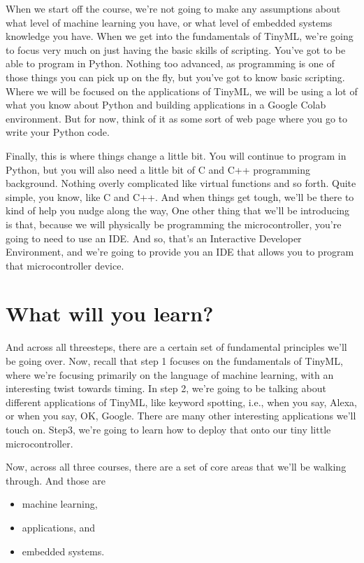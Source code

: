 When we start off the course, we're not going to make any assumptions about what level of machine learning you have, or what level of embedded systems knowledge you have.
When we get into the fundamentals of TinyML, we're going to focus very much on just having the basic skills of scripting.
You've got to be able to program in Python.
Nothing too advanced, as programming is one of those things you can pick up on the fly, but you've got to know basic scripting. Where we will be focused on the applications of TinyML, we will be using a lot of what you know about Python and building applications in a Google Colab environment.
But for now, think of it as some sort of web page where you go to write your Python code.


Finally, this is where things change a little bit.
You will continue to program in Python, but you will also need a little bit of C and C++ programming background.
Nothing overly complicated like virtual functions and so forth.
Quite simple, you know, like C and C++.
And when things get tough, we'll be there to kind of help you nudge along the way, One other thing that we'll be introducing  is that, because we will physically be programming the microcontroller, you're going to need to use an IDE.
And so, that's an Interactive Developer Environment, and we're going to provide you an IDE that allows you
to program that microcontroller device.



\section{What will you learn?}


And across all threesteps, there are a certain set of fundamental principles we'll be going over.
Now, recall that step 1 focuses on the fundamentals of TinyML, where we're focusing primarily on the language of machine learning, with an interesting twist towards timing.
In step 2, we're going to be talking about different applications of TinyML, like keyword spotting, i.e., when you say, Alexa, or when you say, OK, Google.
There are many other interesting applications we'll touch on.
Step3, we're going to learn how to deploy that onto our tiny little microcontroller.

Now, across all three courses, there are a set of core areas that we'll be walking through.
And those are 

\begin{itemize}
    \item machine learning, 
    \item applications, and 
    \item embedded systems.
\end{itemize}

